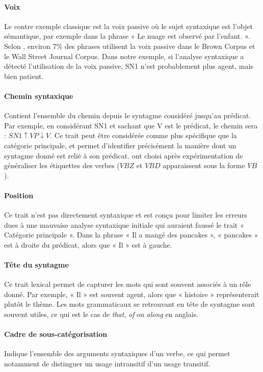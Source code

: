 \paragraph{Voix} Le contre exemple classique est la voix passive où le sujet
syntaxique est l'objet sémantique, par exemple dans la phrase « Le nuage est
observé par l'enfant. ». Selon \cite{roland2002verb}, environ 7\% des phrases
utilisent la voix passive dans le Brown Corpus et le Wall Street Journal
Corpus. Dans notre exemple, si l'analyse syntaxique a détecté l'utilisation de
la voix passive, SN1 n'est probablement plus agent, mais bien patient.

\paragraph{Chemin syntaxique} Contient l'ensemble du chemin depuis le syntagme
considéré jusqu'au prédicat. Par exemple, en considérant SN1 et sachant que V
est le prédicat, le chemin sera : $SN1 \uparrow VP \downarrow V$. Ce trait peut
être considérée comme plus spécifique que la catégorie principale, et permet
d'identifier précisément la manière dont un syntagme donné est relié à son
prédicat. \cite{gildea2002automatic} ont choisi après expérimentation de
généraliser les étiquettes des verbes ($VBZ$ et $VBD$ apparaissent sous la
forme $VB$).

\paragraph{Position} Ce trait n'est pas directement syntaxique et est conçu
pour limiter les erreurs dues à une mauvaise analyse syntaxique initiale qui
auraient faussé le trait « Catégorie principale ». Dans la phrase « Il a mangé
des pancakes », « pancakes » est à droite du prédicat, alors que « Il » est à
gauche.

\paragraph{Tête du syntagme} Ce trait lexical permet de capturer les mots qui
sont souvent associés à un rôle donné. Par exemple, « Il » est souvent agent,
alors que « histoire » représenterait plutôt le thème. Les mots grammaticaux se
retrouvant en tête de syntagme sont souvent utiles, ce qui est le cas de
\textit{that}, \textit{of} ou \textit{along} en anglais.

\paragraph{Cadre de sous-catégorisation} Indique l'ensemble des arguments
syntaxiques d'un verbe, ce qui permet notamment de distinguer un usage
intransitif d'un usage transitif.

